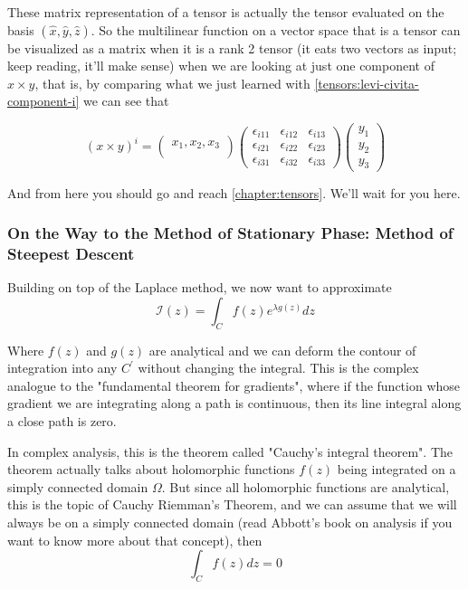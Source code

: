 These matrix representation of a tensor is actually the tensor evaluated on the basis $(\hat{x}, \hat{y}, \hat{z})$.
So the multilinear function on a vector space that is a tensor can be visualized as a matrix when it is a rank 2 tensor
(it eats two vectors as input; keep reading, it'll make sense) when we are looking at just one component of
$x \times y$, that is, by comparing what we just learned with \ref{tensors:levi-civita-component-i} we can see that

$$
\left( x \times y \right)^i =
\begin{pmatrix}
    x_1, x_2, x_3 \\
\end{pmatrix}
\begin{pmatrix}
    \epsilon_{i11} & \epsilon_{i12} & \epsilon_{i13} \\
    \epsilon_{i21} & \epsilon_{i22} & \epsilon_{i23} \\
    \epsilon_{i31} & \epsilon_{i32} & \epsilon_{i33}
\end{pmatrix}
\begin{pmatrix}
    y_1 \\
    y_2 \\
    y_3
\end{pmatrix}
$$

And from here you should go and reach \ref{chapter:tensors}.
We'll wait for you here.




\subsubsection{On the Way to the Method of Stationary Phase: Method of Steepest Descent}

Building on top of the Laplace method, we now want to approximate
$$
\mathcal{I}(z) 
= \int_{C} f(z) e^{\lambda g(z)} dz
$$

Where $f(z)$ and $g(z)$ are analytical and we can deform the contour of integration
into any $C^\prime$ without changing the integral.
This is the complex analogue to the "fundamental theorem for gradients", where if the function whose gradient we are
integrating along a path is continuous, then its line integral along a close path is zero.

In complex analysis, this is the theorem called "Cauchy's integral theorem".
The theorem actually talks about holomorphic functions $f(z)$ being integrated on a simply connected
domain $\Omega$.
But since all holomorphic functions are analytical, this is the topic of Cauchy Riemman's Theorem,
and we can assume that we will always be on a simply connected domain (read Abbott's book on
analysis if you want to know more about that concept), then
$$
\int_{C} f(z) dz = 0
$$
\\


